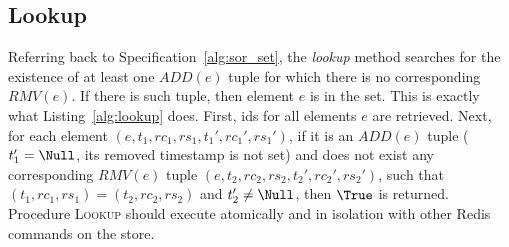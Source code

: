 \begin{figure*}[t]
\begin{minipage}[t]{0.49\linewidth}
\begin{algorithm}[H]
{
    }
    \end{algorithm}
  \end{minipage}
\end{figure*}

\subsection{Lookup}
\label{sec:ops_lookup}

Referring back to Specification~\ref{alg:sor_set}, the \textit{lookup} method
searches for the existence of at least one $ADD(e)$ tuple for which there is no
corresponding $RMV(e)$. If there is such tuple, then element $e$ is in the set.
This is exactly what Listing~\ref{alg:lookup} does. First, ids for all elements
$e$ are retrieved. Next, for each element $(e, t_1, rc_1, rs_1, t_1', rc_1',
rs_1')$, if it is an $ADD(e)$ tuple ($t_{1}' = \Null$, its removed timestamp is
not set) and does not exist any corresponding $RMV(e)$ tuple $(e, t_2, rc_2,
rs_2, t_2', rc_2', rs_2')$, such that $(t_1, rc_1, rs_1) = (t_2, rc_2, rs_2)$
and $t_2' \neq \Null$, then $\True$ is returned. Procedure
{\small\textsc{Lookup}} should execute atomically and in isolation with other
Redis commands on the store.

